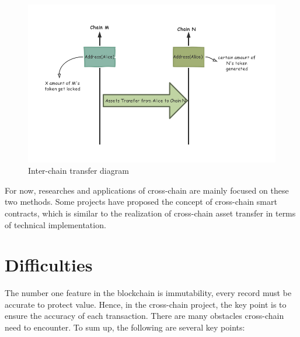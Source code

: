 \begin{enumerate}
    \begin{figure}[H]
    \includegraphics[width=1\textwidth]{./figures/transfer.png}
    \centering
    \caption{Inter-chain transfer diagram}%
    \centering
    \label{fig:transfer}
    \end{figure}
\end{enumerate}

\noindent For now, researches and applications of cross-chain are mainly focused on these two methods. Some projects have proposed the concept of cross-chain smart contracts, which is similar to the realization of cross-chain asset transfer in terms of technical implementation.

\section{Difficulties}
\noindent The number one feature in the blockchain is immutability, every record must be accurate to protect value. Hence, in the cross-chain project, the key point is to ensure the accuracy of each transaction. There are many obstacles cross-chain need to encounter. To sum up, the following are several key points:


